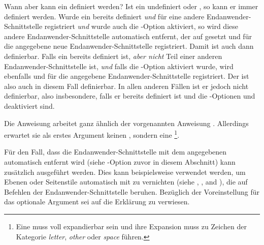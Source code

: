 Wann aber kann ein  definiert
werden? Ist ein  undefiniert oder , so kann er
immer definiert werden. Wurde ein  bereits definiert \emph{und}
für eine andere Endanwender-Schnittstelle registriert \emph{und} wurde auch die
\KOMAScript-Option  aktiviert, so wird diese
andere Endanwender-Schnittstelle automatisch entfernt, der  auf
 gesetzt und für die angegebene neue Endanwender-Schnittstelle
registriert. Damit ist  auch dann definierbar. Falls ein
 bereits definiert ist, \emph{aber nicht} Teil einer anderen
Endanwender-Schnittstelle ist, \emph{und} falls die \KOMAScript-Option
 aktiviert wurde, wird  ebenfalls
 und für die angegebene Endanwender-Schnittstelle
registriert. Der  ist also auch in diesem Fall definierbar. In
allen anderen Fällen ist er jedoch nicht definierbar, also insbesondere, falls
er bereits definiert ist und die \KOMAScript-Optionen
 und  deaktiviert sind.

Die Anweisung  arbeitet ganz ähnlich der
vorgenannten Anweisung . Allerdings erwartet sie
als erstes Argument keinen , sondern eine
\footnote{Eine  muss voll
  expandierbar sein und ihre Expansion muss zu Zeichen der Kategorie
  \emph{letter}, \emph{other} oder \emph{space} führen.}.%
%
\EndIndexGroup


\begin{Declaration}
\end{Declaration}
Für den Fall, dass die Endanwender-Schnittstelle mit dem angegebenen
 automatisch entfernt wird (siehe
\KOMAScript-Option  zuvor in
diesem Abschnitt) kann zusätzlich  ausgeführt werden. Dies kann
beispielsweise verwendet werden, um Ebenen oder Seitenstile automatisch mit zu
vernichten (siehe ,
, and
), die auf Befehlen der
Endanwender-Schnittstelle beruhen. Bezüglich der Voreinstellung für das
optionale Argument sei auf die Erklärung zu
 verwiesen.%
\EndIndexGroup%
\fi%
%
\EndIndexGroup






